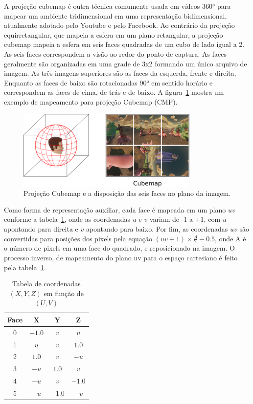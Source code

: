 {A projeção cubemap é outra técnica comumente usada em vídeos 360° para mapear um ambiente tridimensional em uma representação bidimensional, atualmente adotado pelo Youtube e pelo Facebook. Ao contrário da projeção equirretangular, que mapeia a esfera em um plano retangular, a projeção cubemap mapeia a esfera em seis faces quadradas de um cubo de lado igual a 2. As seis faces correspondem a visão ao redor do ponto de captura. As faces geralmente são organizadas em uma grade de 3x2 formando um único arquivo de imagem. As três imagens superiores são as faces da esquerda, frente e direita, Enquanto as faces de baixo são rotacionadas 90° em sentido horário e correspondem as faces de cima, de trás e de baixo. A figura~\ref{fig:cmp} mostra um exemplo de mapeamento para projeção Cubemap (CMP).

\begin{figure}
	\centering
	\includegraphics[width=0.8\textwidth]{fig/cmp.png}
	\caption{Projeção Cubemap e a disposição das seis faces no plano da imagem.}
	\label{fig:cmp}
\end{figure}

Como forma de representação auxiliar, cada face é mapeada em um plano $uv$ conforme a tabela~\ref{tab:uv_erp}, onde as coordenadas $u$ e $v$ variam de -1 a +1, com $u$ apontando para direita e $v$ apontando para baixo. Por fim, as coordenadas $uv$ são convertidas para posições dos pixels pela equação $ (uv+1)\times \frac{A}{2}-0.5$, onde A é o número de pixels em uma face do quadrado, e reposicionado na imagem. O processo inverso, de mapeamento do plano uv para o espaço cartesiano é feito pela tabela~\ref{tab:uv_erp}.

\begin{table}[htbp]
	\centering
	\caption{Tabela de coordenadas $(X, Y, Z)$ em função de $(U, V)$}
	\label{tab:uv_erp}
	\begin{tabular}{|c|c|c|c|}
		\hline
		\textbf{Face} & \textbf{X} & \textbf{Y} & \textbf{Z} \\
		\hline
		0 & $-1.0$ & $v$    & $u$    \\
		1 & $u$    & $v$    & $1.0$  \\
		2 & $1.0$  & $v$    & $-u$   \\
		3 & $-u$   & $1.0$  & $v$    \\
		4 & $-u$   & $v$    & $-1.0$ \\
		5 & $-u$   & $-1.0$ & $-v$   \\
		\hline
	\end{tabular}
\end{table}

}
